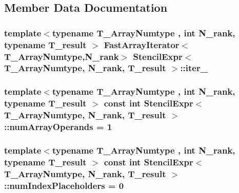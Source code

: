 \subsection{Member Data Documentation}
\hypertarget{classStencilExpr_a6b95b9fe43853c84b71550ea5c38cf35}{}
\subsubsection[{iter\+\_\+}]{\setlength{\rightskip}{0pt plus 5cm}template$<$typename T\+\_\+\+Array\+Numtype , int N\+\_\+rank, typename T\+\_\+result $>$ {\bf Fast\+Array\+Iterator}$<$T\+\_\+\+Array\+Numtype,N\+\_\+rank$>$ {\bf Stencil\+Expr}$<$ T\+\_\+\+Array\+Numtype, N\+\_\+rank, T\+\_\+result $>$\+::iter\+\_\+\hspace{0.3cm}{\ttfamily [protected]}}\label{classStencilExpr_a6b95b9fe43853c84b71550ea5c38cf35}
\hypertarget{classStencilExpr_a20c4d644c82cdaf9af6ab1a419dc1a9d}{}
\subsubsection[{num\+Array\+Operands}]{\setlength{\rightskip}{0pt plus 5cm}template$<$typename T\+\_\+\+Array\+Numtype , int N\+\_\+rank, typename T\+\_\+result $>$ const int {\bf Stencil\+Expr}$<$ T\+\_\+\+Array\+Numtype, N\+\_\+rank, T\+\_\+result $>$\+::num\+Array\+Operands = 1\hspace{0.3cm}{\ttfamily [static]}}\label{classStencilExpr_a20c4d644c82cdaf9af6ab1a419dc1a9d}
\hypertarget{classStencilExpr_a7fe20bd5aa8c981d33a1e06dde54f9b6}{}
\subsubsection[{num\+Index\+Placeholders}]{\setlength{\rightskip}{0pt plus 5cm}template$<$typename T\+\_\+\+Array\+Numtype , int N\+\_\+rank, typename T\+\_\+result $>$ const int {\bf Stencil\+Expr}$<$ T\+\_\+\+Array\+Numtype, N\+\_\+rank, T\+\_\+result $>$\+::num\+Index\+Placeholders = 0\hspace{0.3cm}{\ttfamily [static]}}\label{classStencilExpr_a7fe20bd5aa8c981d33a1e06dde54f9b6}
\hypertarget{classStencilExpr_ad3f5edc99b864f011b2d88bce7ac3b48}{}
